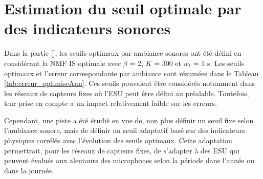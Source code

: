 \chapter{Estimation du seuil optimale par des indicateurs sonores}\label{annexe:optThreshold}

Dans la partie \ref{}, les seuils optimaux par ambiance sonores ont été défini en considérant la NMF IS optimale avec $\beta$ = 2, $K$ = 300 et $w_t$ = 1 s. Les seuils optimaux et l'erreur correspondante par ambiance sont résumées dans le Tableau \ref{tab:erreur_optimiseAnn}.
Ces seuils pouvaient être considérés notamment dans les réseaux de capteurs fixes où l'ESU peut être défini au préalable. Toutefois, leur prise en compte a un impact relativement faible sur les erreurs. 

Cependant, une piste a été étudié en vue de, non plus définir un seuil fixe selon l'ambiance sonore, mais de définir un seuil adaptatif basé sur des indicateurs physiques corrélés avec l'évolution des seuils optimaux. Cette adaptation permettrait, pour les réseaux de capteurs fixes, de s'adapter à des ESU qui peuvent évolués aux alentours des microphones selon la période dans l'année ou dans la journée.

\begin{table}[h]
\centering
\caption{Erreurs $MAE_{60}$ minimales selon le seuil optimal $t_{h,opt}$ par ambiance sonore.}
\label{tab:erreur_optimiseAnn}
\end{table}



